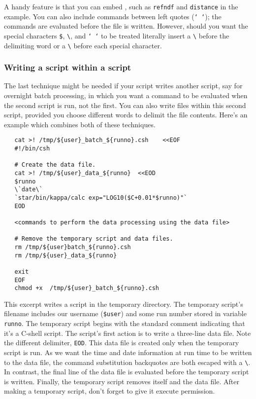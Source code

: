 A handy feature is that you can embed , such as {\tt refndf} and {\tt distance}
in the example.  You can also include commands between left quotes
({\tt `~`}); the commands are evaluated before the file is written.
However, should you want the special characters {\tt \$}, \verb+\+,
and {\tt `~`} to be treated literally insert a \verb+\+ before the
delimiting word or a \verb+\+ before each special character.

\subsubsection{Writing a script within a
script\label{sc4_se_write_script}}

The last technique might be needed if your script writes another
script, say for overnight batch processing, in which you want a command
to be evaluated when the second script is run, not the first.
You can also write files within this second script, provided you choose
different words to delimit the file contents.  Here's an example which
combines both of these techniques.

\small
\begin{verbatim}
   cat >! /tmp/${user}_batch_${runno}.csh    <<EOF
   #!/bin/csh

   # Create the data file.
   cat >! /tmp/${user}_data_${runno}  <<EOD
   $runno
   \`date\`
   `star/bin/kappa/calc exp="LOG10($C+0.01*$runno)"`
   EOD

   <commands to perform the data processing using the data file>

   # Remove the temporary script and data files.
   rm /tmp/${user}batch_${runno}.csh
   rm /tmp/${user}_data_${runno}

   exit
   EOF
   chmod +x  /tmp/${user}_batch_${runno}.csh
\end{verbatim}
\normalsize

This excerpt writes a script in the temporary directory.  The
temporary script's filename includes our username ({\tt \$user}) and
some run number stored in variable {\tt runno}.  The temporary script
begins with the standard comment indicating that it's a C-shell
script.  The script's first action is to write a three-line data file.
Note the different delimiter, {\tt EOD}.  This data file is created
only when the temporary script is run.  As we want the time and date
information at run time to be written to the data file, the command
substitution backquotes are both escaped with a \verb+\+.  In
contrast, the final line of the data file is evaluated before the
temporary script is written.  Finally, the temporary script removes
itself and the data file.  After making a temporary script, don't
forget to give it execute permission.

